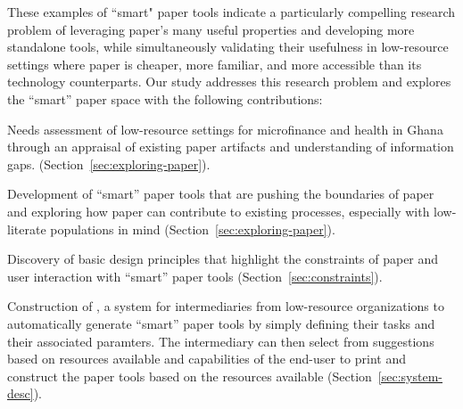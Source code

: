 \documentclass{sig-alternate}
\begin{document}
These examples of ``smart" paper tools indicate a particularly compelling research problem of leveraging paper's many useful properties and developing more standalone tools, while simultaneously validating their usefulness in low-resource settings where paper is cheaper, more familiar, and more accessible than its technology counterparts. Our study addresses this research problem and explores the ``smart'' paper space with the following contributions:

\begin{compactitem}

  \item Needs assessment of low-resource settings for microfinance and health in Ghana through an appraisal of existing paper artifacts and understanding of information gaps. (Section~\ref{sec:exploring-paper}).
  \item Development of ``smart'' paper tools that are pushing the boundaries of paper and exploring how paper can contribute to existing processes, especially with low-literate populations in mind (Section~\ref{sec:exploring-paper}).
  \item Discovery of basic design principles that highlight the constraints of paper and user interaction with ``smart'' paper tools (Section~\ref{sec:constraints}).
  \item Construction of \nifty, a system for intermediaries from low-resource organizations to automatically generate ``smart'' paper tools by simply defining their tasks and their associated paramters. The intermediary can then select from suggestions based on resources available and capabilities of the end-user to print and construct the paper tools based on the resources available (Section~\ref{sec:system-desc}). 

\end{compactitem}


\end{document}

